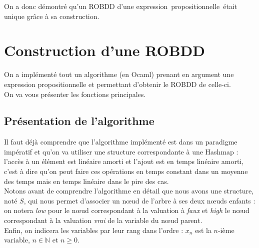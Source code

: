 \documentclass[a4paper, oneside]{report}
\newcommand{\expp}{expression~propositionnelle~}
\begin{document}
On a donc démontré qu'un ROBDD d'une \expp était unique grâce à sa construction.


\chapter{Construction d'une ROBDD}

\label{algo}
On a implémenté tout un algorithme (en Ocaml) prenant en argument une expression propositionnelle et permettant d'obtenir le ROBDD de celle-ci.\\
On va vous présenter les fonctions principales.

\section{Présentation de l'algorithme}

Il faut déjà comprendre que l'algorithme implémenté est dans un paradigme impératif et qu'on va utiliser une structure correspondante à une Hashmap : l'accès à un élément est linéaire amorti et l'ajout est en temps linéaire amorti, c'est à dire qu'on peut faire ces opérations en temps constant dans un moyenne des temps mais en temps linéaire dans le pire des cas.\\
Notons avant de comprendre l'algorithme en détail que nous avons une structure, noté $S$, qui nous permet d'associer un nœud de l'arbre à ses deux nœuds enfants : on notera \textit{low} pour le nœud correspondant à la valuation à \textit{faux} et \textit{high} le nœud correspondant à la valuation \textit{vrai} de la variable du nœud parent.\\
Enfin, on indicera les variables par leur rang dans l'ordre : $x_n$ est la $n$-ième variable, $n\in \mathbb{N}$ et $n\geq 0$.\\
\end{document}
